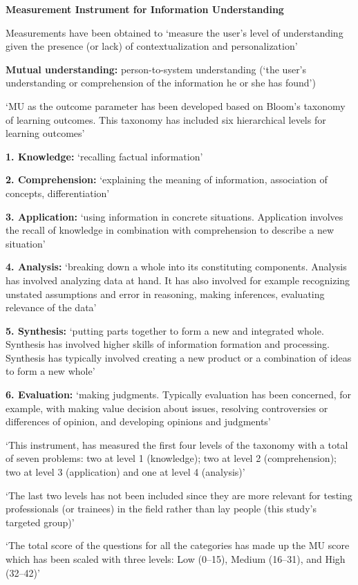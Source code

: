 \documentclass[]{article}
\begin{document}
\textbf{Measurement Instrument for Information Understanding}

Measurements have been obtained to ‘measure the user’s level of understanding given the presence (or lack) of contextualization and personalization’

\textbf{Mutual understanding:} person-to-system understanding (‘the user’s understanding or comprehension of the information he or she has found’)

‘MU as the outcome parameter has been developed based on Bloom’s taxonomy of learning outcomes. This taxonomy has included six hierarchical levels for learning outcomes’

\textbf{1.	Knowledge:} ‘recalling factual information’

\textbf{2.	Comprehension:} ‘explaining the meaning of information, association of concepts, differentiation’

\textbf{3.	Application:} ‘using information in concrete situations. Application involves the recall of knowledge in combination with comprehension to describe a new situation’

\textbf{4.	Analysis:} ‘breaking down a whole into its constituting components. Analysis has involved analyzing data at hand. It has also involved for example recognizing unstated assumptions and error in reasoning, making inferences, evaluating relevance of the data’

\textbf{5.	Synthesis:} ‘putting parts together to form a new and integrated whole. Synthesis has involved higher skills of information formation and processing. Synthesis has typically involved creating a new product or a combination of ideas to form a new whole’

\textbf{6.	Evaluation:} ‘making judgments. Typically evaluation has been concerned, for example, with making value decision about issues, resolving controversies or differences of opinion, and developing opinions and judgments’

‘This instrument, has measured the first four levels of the taxonomy with a total of seven problems: two at level 1 (knowledge); two at level 2 (comprehension); two at level 3 (application) and one at level 4 (analysis)’

‘The last two levels has not been included since they are more relevant for testing professionals (or trainees) in the field rather than lay people (this study’s targeted group)’

‘The total score of the questions for all the categories has made up the MU score which has been scaled with three levels: Low (0–15), Medium (16–31), and High (32–42)’
\end{document}
